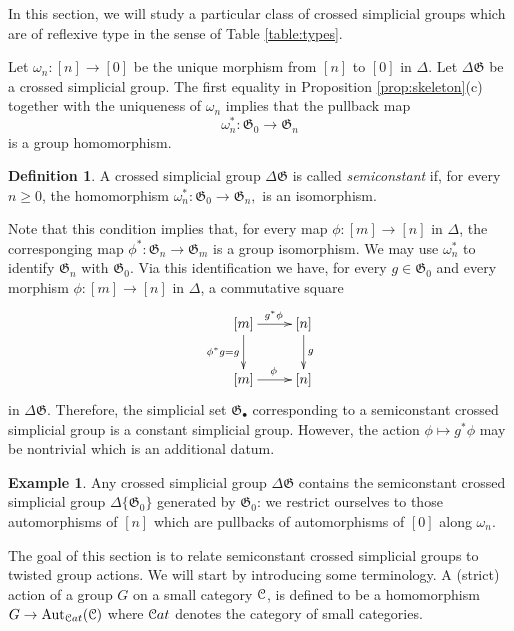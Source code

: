 \documentclass[english,11pt,leqno]{article}
\def\Gen{\mathfrak{G}}
\def\Aut{\operatorname{Aut}\nolimits}
\def\lra{\longrightarrow}
\def\Cat{{\mathcal Cat}}
\def\C{{\EuScript C}}
\def\Cat{{\EuScript Cat}}
\def\DG{ {\Delta \Gen}}
\theoremstyle{definition}
\newtheorem{defi}[thm]{Definition}
\newtheorem{exa}[thm]{Example}
\theoremstyle{remark}
\numberwithin{equation}{section}
\begin{document}
In this section, we will study a particular class of crossed simplicial groups which are of reflexive type in
the sense of Table \ref{table:types}. 

Let $\omega_n: [n]\to [0]$ be the unique morphism from $[n]$ to $[0]$ in $\Delta$.  
Let $\DG$ be a crossed simplicial group.  The first equality in
Proposition \ref{prop:skeleton}(c)
  together with
the uniqueness of $\omega_n$ implies that the pullback map
\[
	\omega_n^*: \Gen_0 \lra \Gen_n
\]
is a group homomorphism. 

\begin{defi}
 A crossed simplicial group $\DG$  is called {\em
semiconstant} if, for every $n \ge 0$, the homomorphism 
$
	\omega_n^*: \Gen_0 \lra \Gen_n,
$
  is an
isomorphism. 

\end{defi}

Note that this condition implies that, for every map $\phi: [m] \to [n]$ in $\Delta$,
the corresponging map $\phi^*: \Gen_n \to \Gen_m$ is a group isomorphism. We may use $\omega_n^*$
to identify $\Gen_n$ with $\Gen_0$. Via this identification we have, for every $g \in \Gen_0$ and
every morphism $\phi: [m] \to [n]$ in $\Delta$, a commutative square
\begin{equation}\label{eq:semiconstant}
	\xymatrix{ [m] \ar[d]_{\phi^*g = g}\ar[r]^{g^*\phi} & [n]\ar[d]^g\\
		[m] \ar[r]^{\phi} & [n]}
\end{equation}
in $\DG$. Therefore, the simplicial set $\Gen_{\bullet}$ corresponding to a semiconstant crossed
simplicial group is a constant simplicial group. However, the action $\phi \mapsto g^*\phi$ may 
be nontrivial which is an additional datum.

\begin{exa}\label{ex:semiconst-emb}
Any crossed simplicial group $\DG$ contains the semiconstant crossed simplicial group
	$\Delta \{\Gen_0\}$ generated by $\Gen_0$: we restrict ourselves to those automorphisms of $[n]$
	which are pullbacks of automorphisms of $[0]$ along  $\omega_n$. 

\end{exa}



 
The goal of this section is to relate semiconstant crossed simplicial groups to twisted group
actions. We will start by introducing some terminology. A (strict) action of a group $G$ on a small
category $\C$, is defined to be a homomorphism $G \to \Aut_{\Cat}(\C)$ where $\Cat$ denotes the
category of small categories.
\end{document}
